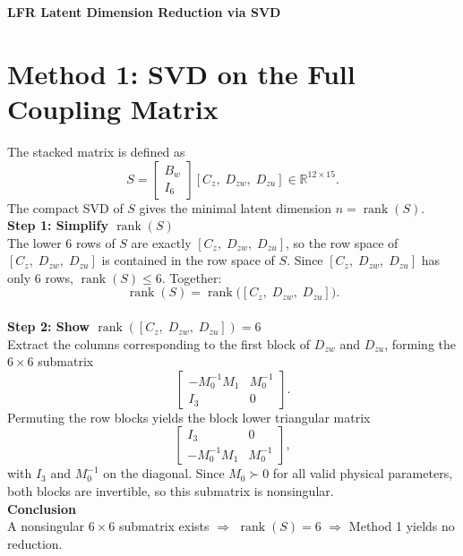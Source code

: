 \documentclass[11pt]{article}
\begin{document}
\begin{center}
    {\LARGE\bfseries LFR Latent Dimension Reduction via SVD}\\[0.5em]
\end{center}

\vspace{0.7em}

\noindent

\section{Method 1: SVD on the Full Coupling Matrix}
The stacked matrix is defined as
\[
S = \begin{bmatrix} B_w \\ I_6 \end{bmatrix} [C_z,\; D_{zw},\; D_{zu}] \in \mathbb{R}^{12\times 15}.
\]
The compact SVD of $S$ gives the minimal latent dimension $n = \operatorname{rank}(S)$.
\medskip
\\
\textbf{Step 1: Simplify $\operatorname{rank}(S)$}\\
The lower 6 rows of $S$ are exactly $[C_z,\; D_{zw},\; D_{zu}]$, so the row 
space of $[C_z,\; D_{zw},\; D_{zu}]$ is contained in the row space of $S$. 
Since $[C_z,\; D_{zw},\; D_{zu}]$ has only 6 rows, $\operatorname{rank}(S) \leq 6$.
Together:
\[
\operatorname{rank}(S) = \operatorname{rank}\bigl([C_z,\; D_{zw},\; D_{zu}]\bigr).
\]
\medskip
\\
\textbf{Step 2: Show $\operatorname{rank}([C_z,\; D_{zw},\; D_{zu}]) = 6$}\\
Extract the columns corresponding to the first block of $D_{zw}$ and $D_{zu}$,
forming the $6\times 6$ submatrix
\[
\begin{bmatrix} -M_0^{-1}M_1 & M_0^{-1} \\ I_3 & 0 \end{bmatrix}.
\]
Permuting the row blocks yields the block lower triangular matrix
\[
\begin{bmatrix} I_3 & 0 \\ -M_0^{-1}M_1 & M_0^{-1} \end{bmatrix},
\]
with $I_3$ and $M_0^{-1}$ on the diagonal. Since $M_0 \succ 0$ for all valid 
physical parameters, both blocks are invertible, so this submatrix is nonsingular.
\medskip
\\
\textbf{Conclusion}\\
A nonsingular $6\times 6$ submatrix exists $\Rightarrow$ 
$\operatorname{rank}(S) = 6$ $\Rightarrow$ Method 1 yields no reduction.
\end{document}

